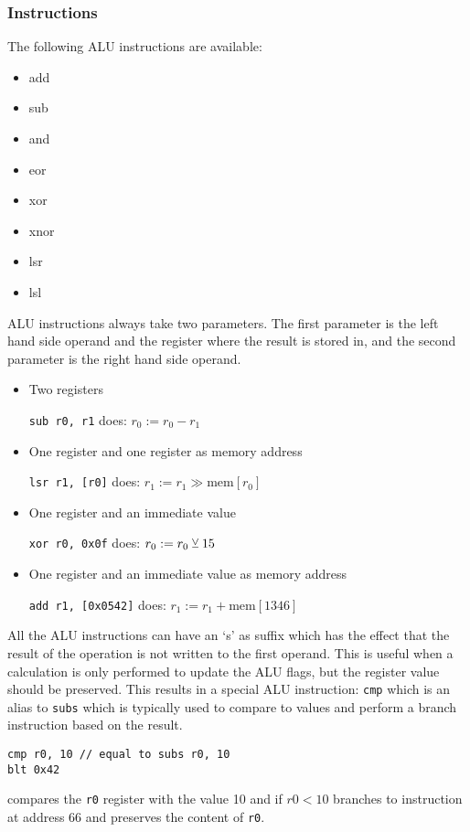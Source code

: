 \subsubsection{ Instructions}
The following \gls{ALU} instructions are available:
\begin{multicols}{4}
  \begin{itemize}
    \item add
    \item sub
    \item and
    \item eor
    \item xor
    \item xnor
    \item lsr
    \item lsl
  \end{itemize}
\end{multicols}
\gls{ALU} instructions always take two parameters. The first parameter is the left hand side operand and the register where the result is stored in, and the second parameter is the right hand side operand.
\begin{itemize}
  \item Two registers

        \qquad\texttt{sub r0, r1} does: $r_0:=r_0-r_1$
  \item One register and one register as memory address

        \qquad\texttt{lsr r1, [r0]} does: $r_1:=r_1\gg\text{mem}[r_0]$
  \item One register and an immediate value

        \qquad\texttt{xor r0, 0x0f} does: $r_0:=r_0\veebar 15$
  \item One register and an immediate value as memory address

        \qquad\texttt{add r1, [0x0542]} does: $r_1:=r_1+\text{mem}[1346]$
\end{itemize}
All the \gls{ALU} instructions can have an `s' as suffix which has the effect that the result of the operation is not written to the first operand.
This is useful when a calculation is only performed to update the \gls{ALU} flags, but the register value should be preserved.
This results in a special \gls{ALU} instruction: \texttt{cmp} which is an alias to \texttt{subs} which is typically used to compare to values and perform a branch instruction based on the result.
\begin{verbatim}
cmp r0, 10 // equal to subs r0, 10
blt 0x42
\end{verbatim}
compares the \texttt{r0} register with the value 10 and if $r0 < 10$ branches to instruction at address 66 and preserves the content of \texttt{r0}.

